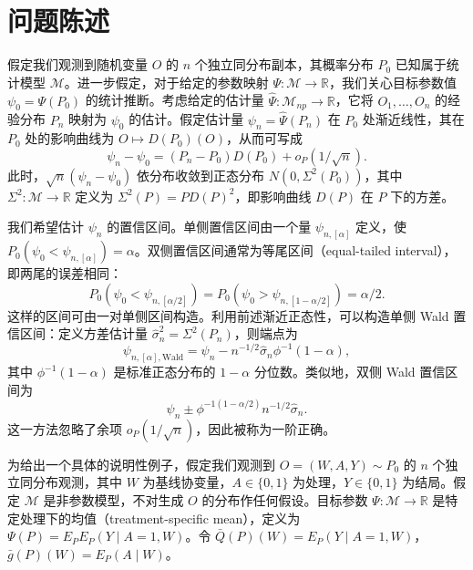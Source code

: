 \section{问题陈述}

假定我们观测到随机变量 $O$ 的 $n$ 个独立同分布副本，其概率分布 $P_0$ 已知属于统计模型 $\mathcal M$。进一步假定，对于给定的参数映射 $\Psi:\mathcal M\to\mathbb R$，我们关心目标参数值 $\psi_0=\Psi(P_0)$ 的统计推断。考虑给定的估计量 $\hat\Psi:\mathcal M_{np}\to\mathbb R$，它将 $O_1,\ldots,O_n$ 的经验分布 $P_n$ 映射为 $\psi_0$ 的估计。假定估计量 $\psi_n=\hat\Psi(P_n)$ 在 $P_0$ 处渐近线性，其在 $P_0$ 处的影响曲线为 $O\mapsto D(P_0)(O)$，从而可写成
\[
 \psi_n-\psi_0=(P_n-P_0)D(P_0)+o_P(1/\sqrt n).
\]
此时，$\sqrt n(\psi_n-\psi_0)$ 依分布收敛到正态分布 $N(0,\Sigma^2(P_0))$，其中 $\Sigma^2:\mathcal M\to\mathbb R$ 定义为 $\Sigma^2(P)=PD(P)^2$，即影响曲线 $D(P)$ 在 $P$ 下的方差。

我们希望估计 $\psi_n$ 的置信区间。单侧置信区间由一个量 $\psi_{n,[\alpha]}$ 定义，使
$P_0(\psi_0<\psi_{n,[\alpha]})=\alpha$。双侧置信区间通常为等尾区间（equal-tailed interval），即两尾的误差相同：
\[
 P_0(\psi_0<\psi_{n,[\alpha/2]})
 =P_0(\psi_0>\psi_{n,[1-\alpha/2]})=\alpha/2.
\]
这样的区间可由一对单侧区间构造。利用前述渐近正态性，可以构造单侧 Wald 置信区间：定义方差估计量 $\hat\sigma_n^2=\Sigma^2(P_n)$，则端点为
\[
 \psi_{n,[\alpha],\mathrm{Wald}}
 =\psi_n-n^{-1/2}\hat\sigma_n\phi^{-1}(1-\alpha),
\]
其中 $\phi^{-1}(1-\alpha)$ 是标准正态分布的 $1-\alpha$ 分位数。类似地，双侧 Wald 置信区间为
\[
 \psi_n\pm\phi^{-1(1-\alpha/2)}n^{-1/2}\hat\sigma_n.
\]
这一方法忽略了余项 $o_P(1/\sqrt n)$，因此被称为一阶正确。

为给出一个具体的说明性例子，假定我们观测到 $O=(W,A,Y)\sim P_0$ 的 $n$ 个独立同分布观测，其中 $W$ 为基线协变量，$A\in\{0,1\}$ 为处理，$Y\in\{0,1\}$ 为结局。假定 $\mathcal M$ 是非参数模型，不对生成 $O$ 的分布作任何假设。目标参数 $\Psi:\mathcal M\to\mathbb R$ 是特定处理下的均值（treatment-specific mean），定义为
$\Psi(P)=E_PE_P(Y\mid A=1,W)$。令
$\bar Q(P)(W)=E_P(Y\mid A=1,W)$，$\bar g(P)(W)=E_P(A\mid W)$。
